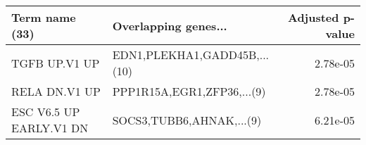 \begin{tabular}{llr}
\toprule
         Term name (33) &         Overlapping genes... &  Adjusted p-value \\
\midrule
          TGFB UP.V1 UP & EDN1,PLEKHA1,GADD45B,...(10) &          2.78e-05 \\
          RELA DN.V1 UP &   PPP1R15A,EGR1,ZFP36,...(9) &          2.78e-05 \\
ESC V6.5 UP EARLY.V1 DN &     SOCS3,TUBB6,AHNAK,...(9) &          6.21e-05 \\
\bottomrule
\end{tabular}
